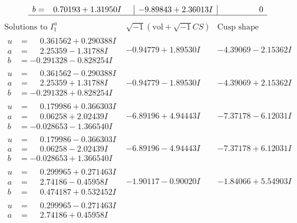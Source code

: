 \documentclass[1p]{elsarticle_modified}
\theoremstyle{definition}
\newcommand{\I}{\sqrt{-1}}
\begin{document}
$$\begin{array}{c|c|c}
\begin{aligned}
b &= \phantom{-}0.70193 + 1.31950 I\end{aligned}
 & -9.89843 + 2.36013 I & \phantom{-0.000000 } 0\\
 \hline 
 \end{array}$$\newpage$$\begin{array}{c|c|c}  
\text{Solutions to }I^u_{1}& \I (\text{vol} + \sqrt{-1}CS) & \text{Cusp shape}\\
 \hline 
\begin{aligned}
u &= \phantom{-}0.361562 + 0.290388 I \\
a &= \phantom{-}2.25359 - 1.31788 I \\
b &= -0.291328 - 0.828254 I\end{aligned}
 & -0.94779 + 1.89530 I & -4.39069 - 2.15362 I \\ \hline\begin{aligned}
u &= \phantom{-}0.361562 - 0.290388 I \\
a &= \phantom{-}2.25359 + 1.31788 I \\
b &= -0.291328 + 0.828254 I\end{aligned}
 & -0.94779 - 1.89530 I & -4.39069 + 2.15362 I \\ \hline\begin{aligned}
u &= \phantom{-}0.179986 + 0.366303 I \\
a &= \phantom{-}0.06258 + 2.02439 I \\
b &= -0.028653 - 1.366540 I\end{aligned}
 & -6.89196 + 4.94443 I & -7.37178 - 6.12031 I \\ \hline\begin{aligned}
u &= \phantom{-}0.179986 - 0.366303 I \\
a &= \phantom{-}0.06258 - 2.02439 I \\
b &= -0.028653 + 1.366540 I\end{aligned}
 & -6.89196 - 4.94443 I & -7.37178 + 6.12031 I \\ \hline\begin{aligned}
u &= \phantom{-}0.299965 + 0.271463 I \\
a &= \phantom{-}2.74186 - 0.45958 I \\
b &= \phantom{-}0.474187 + 0.532452 I\end{aligned}
 & -1.90117 - 0.90020 I & -1.84066 + 5.54903 I \\ \hline\begin{aligned}
u &= \phantom{-}0.299965 - 0.271463 I \\
a &= \phantom{-}2.74186 + 0.45958 I \\

\end{aligned}
\end{array}$$
\end{document}
